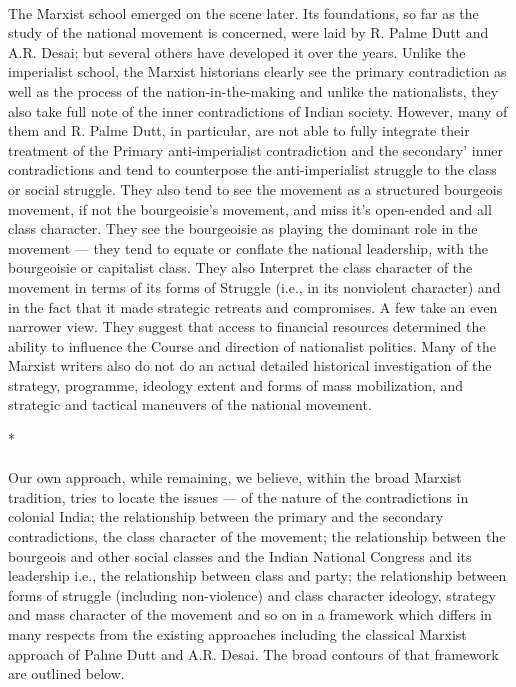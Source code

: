\begin{multicols}{2}
\paragraph*{}
The Marxist school emerged on the scene later. Its foundations, so far as the study of the national movement is concerned, were laid by R. Palme Dutt and A.R. Desai; but several others have developed it over the years. Unlike the imperialist school, the Marxist historians clearly see the primary contradiction as well as the process of the nation-in-the-making and unlike the nationalists, they also take full note of the inner contradictions of Indian society. However, many of them and R. Palme Dutt, in particular, are not able to fully integrate their treatment of the Primary anti-imperialist contradiction and the secondary' inner contradictions and tend to counterpose the anti-imperialist struggle to the class or social struggle. They also tend to see the movement as a structured bourgeois movement, if not the bourgeoisie's movement, and miss it's open-ended and all class character. They see the bourgeoisie as playing the dominant role in the movement --- they tend to equate or conflate the national leadership, with the bourgeoisie or capitalist class. They also Interpret the class character of the movement in terms of its forms of Struggle (i.e., in its nonviolent character) and in the fact that it made strategic retreats and compromises. A few take an even narrower view. They suggest that access to financial resources determined the ability to influence the Course and direction of nationalist politics. Many of the Marxist writers also do not do an actual detailed historical investigation of the strategy, programme, ideology extent and forms of mass mobilization, and strategic and tactical maneuvers of the national movement.

\begin{center}*\end{center}

\paragraph*{}
Our own approach, while remaining, we believe, within the broad Marxist tradition, tries to locate the issues --- of the nature of the contradictions in colonial India; the relationship between the primary and the secondary contradictions, the class character of the movement; the relationship between the bourgeois and other social classes and the Indian National Congress and its leadership i.e., the relationship between class and party; the relationship between forms of struggle (including non-violence) and class character ideology, strategy and mass character of the movement and so on in a framework which differs in many respects from the existing approaches including the classical Marxist approach of Palme Dutt and A.R. Desai. The broad contours of that framework are outlined below.


\end{multicols}
